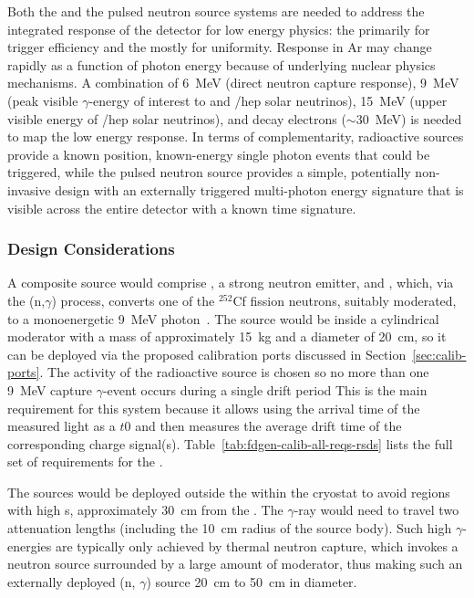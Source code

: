 Both the  and the pulsed neutron source systems are needed to address the integrated response of the detector for low energy physics: 
the  primarily for trigger efficiency and the  mostly for uniformity. Response in Ar may change rapidly as a function of photon energy because of underlying nuclear physics mechanisms. A combination of \SI{6}{\MeV} (direct neutron capture response), \SI{9}{\MeV} (peak visible $\gamma$-energy of interest to  and /hep solar neutrinos), \SI{15}{\MeV} (upper visible energy of /hep solar neutrinos), and decay electrons ($\sim$\SI{30}{\MeV}) is needed to map the low energy response. In terms of complementarity, radioactive sources provide a known position, known-energy single photon events that could be triggered, while the pulsed neutron source provides a simple, potentially non-invasive design with an externally triggered multi-photon energy signature that is visible across the entire detector with a known time signature.


\subsubsection{Design Considerations}

A composite source would comprise , a strong neutron emitter, and , which, via the (n,$\gamma$) process, converts one of the $^{252}$Cf fission neutrons, suitably moderated, to a monoenergetic \SI{9}{\MeV} photon~\cite{Rogers:1996ks}. 
The source would be inside a cylindrical moderator with a mass of approximately \SI{15}{kg} and a diameter of \SI{20}{\cm}, so it can be deployed via the proposed calibration ports discussed in Section~\ref{sec:calib-ports}. The activity of the radioactive source is chosen so no more than one \SI{9}{\MeV} capture $\gamma$-event occurs during a single drift period
This is the main requirement for this system because it allows using the arrival time of the measured light as a $t0$ and then measures the average drift time of the corresponding charge signal(s). Table~\ref{tab:fdgen-calib-all-reqs-rsds} lists the full set of requirements for the .

The sources would be deployed outside the  within the cryostat to avoid regions with high \efield{}s, approximately \SI{30}{\cm} from the . The $\gamma$-ray would need to travel two attenuation lengths (including the \SI{10}{\cm} radius of the source body). Such high $\gamma$-energies are typically only achieved by thermal neutron capture, which invokes a neutron source surrounded by a large amount of moderator, thus making such an externally deployed (n, $\gamma$) source \SI{20}{\cm}  to \SI{50}{\cm} %
in diameter. 

